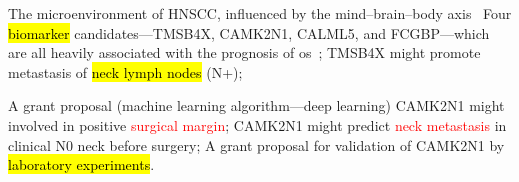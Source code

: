 \documentclass[
paper=landscape,
paper=160mm:90mm, %
fontsize=11pt, %
pagesize, %
parskip=half-, %
]{scrartcl} %
\theoremstyle{mythmstyle} %
\begin{document}
\begin{outline}

\1 The microenvironment of HNSCC, influenced by the mind--brain--body axis~\autocite{Hsiao2012}
    \2 Four \hl{biomarker} candidates---TMSB4X, CAMK2N1, CALML5, and FCGBP---which are all heavily associated with the prognosis of \acrlong{os}~\autocite{Chi2017, Chi2021};
    \2 TMSB4X might promote metastasis of \hl{neck lymph nodes} (N+);

    

\1 A grant proposal (machine learning algorithm---deep learning)
    \2 CAMK2N1 might involved in positive \textcolor{red}{surgical margin};
    \2 CAMK2N1 might predict \textcolor{red}{neck metastasis} in clinical N0 neck before surgery;
\1 A grant proposal for validation of CAMK2N1 by \hl{laboratory experiments}.

\end{outline}

%
\clearpage

\thispagestyle{headings}
\end{document}
